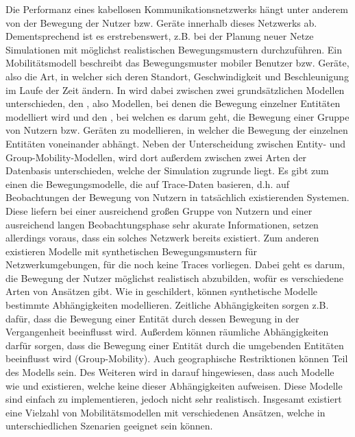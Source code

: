 \documentclass[12pt, a4paper]{article}
\begin{document}
Die Performanz eines kabellosen Kommunikationsnetzwerks hängt unter anderem von der Bewegung 
der Nutzer bzw. Geräte innerhalb dieses Netzwerks ab. Dementsprechend ist es erstrebenswert,
z.B. bei der Planung neuer Netze Simulationen mit möglichst realistischen Bewegungsmustern durchzuführen.
Ein Mobilitätsmodell beschreibt das Bewegungsmuster mobiler Benutzer bzw. Geräte,
also die Art, in welcher sich deren Standort, Geschwindigkeit und Beschleunigung im Laufe der Zeit ändern. \cite{Camp2002}
In \cite{Camp2002} wird dabei zwischen zwei grundsätzlichen Modellen unterschieden, den ,
also Modellen, bei denen die Bewegung einzelner Entitäten modelliert wird und den ,
bei welchen es darum geht, die Bewegung einer Gruppe von Nutzern bzw. Geräten zu modellieren,
in welcher die Bewegung der einzelnen Entitäten voneinander abhängt.\newline
Neben der Unterscheidung zwischen Entity- und Group-Mobility-Modellen, wird dort außerdem zwischen zwei Arten der Datenbasis unterschieden,
welche der Simulation zugrunde liegt. Es gibt zum einen die Bewegungsmodelle, die auf Trace-Daten basieren, d.h. auf Beobachtungen
der Bewegung von Nutzern in tatsächlich existierenden Systemen. Diese liefern bei einer ausreichend großen Gruppe von Nutzern
und einer ausreichend langen Beobachtungsphase sehr akurate Informationen, setzen allerdings voraus, dass ein solches Netzwerk
bereits existiert. \cite{Camp2002} Zum anderen existieren Modelle mit synthetischen Bewegungsmustern für Netzwerkumgebungen, 
für die noch keine Traces vorliegen. Dabei geht es darum, die Bewegung der Nutzer möglichst realistisch abzubilden,
wofür es verschiedene Arten von Ansätzen gibt.\newline
Wie in \cite{Aschenbruck2011} geschildert, können synthetische Modelle bestimmte Abhängigkeiten modellieren.
Zeitliche Abhängigkeiten sorgen z.B. dafür, dass die Bewegung einer Entität durch dessen Bewegung in der Vergangenheit
beeinflusst wird. Außerdem können räumliche Abhängigkeiten darfür sorgen, dass die Bewegung einer Entität durch die umgebenden 
Entitäten beeinflusst wird (Group-Mobility). Auch geographische Restriktionen können Teil des Modells sein.
Des Weiteren wird in \cite{Aschenbruck2011} darauf hingewiesen, dass auch Modelle wie
 und  existieren, welche keine dieser Abhängigkeiten
aufweisen. Diese Modelle sind einfach zu implementieren, jedoch nicht sehr realistisch.
Insgesamt existiert eine Vielzahl von Mobilitätsmodellen mit verschiedenen Ansätzen, welche in unterschiedlichen
Szenarien geeignet sein können.
\end{document}

